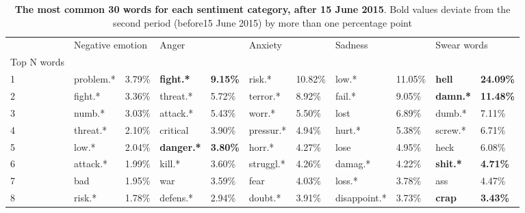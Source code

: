 \begin{table}[h]\centering
\caption{\textbf{The most common 30 words for each sentiment category, after 15 June 2015}. Bold values deviate from the second period (before15 June 2015) by more than one percentage point}
	\label{fig: after_1}
\begin{adjustbox}{width=\linewidth, center}
	\begin{tabular}{lllllllllll}
	\toprule
	{} & \multicolumn{2}{l}{Negative emotion} & \multicolumn{2}{l}{Anger} & \multicolumn{2}{l}{Anxiety} & \multicolumn{2}{l}{Sadness} & \multicolumn{2}{l}{Swear words} \\
	Top N words          &                  &            &                    &                  &              &            &               &            &                  &                   \\
	\midrule
	1                    &        problem.* &     3.79\% &   \textbf{fight.*} &  \textbf{9.15\%} &       risk.* &    10.82\% &         low.* &    11.05\% &    \textbf{hell} &  \textbf{24.09\%} \\
	2                    &          fight.* &     3.36\% &           threat.* &           5.72\% &     terror.* &     8.92\% &        fail.* &     9.05\% &  \textbf{damn.*} &  \textbf{11.48\%} \\
	3                    &           numb.* &     3.03\% &           attack.* &           5.43\% &       worr.* &     5.50\% &          lost &     6.89\% &           dumb.* &            7.11\% \\
	4                    &         threat.* &     2.10\% &           critical &           3.90\% &    pressur.* &     4.94\% &        hurt.* &     5.38\% &          screw.* &            6.71\% \\
	5                    &            low.* &     2.04\% &  \textbf{danger.*} &  \textbf{3.80\%} &       horr.* &     4.27\% &          lose &     4.95\% &             heck &            6.08\% \\
	6                    &         attack.* &     1.99\% &             kill.* &           3.60\% &    struggl.* &     4.26\% &       damag.* &     4.22\% &  \textbf{shit.*} &   \textbf{4.71\%} \\
	7                    &              bad &     1.95\% &                war &           3.59\% &         fear &     4.03\% &        loss.* &     3.78\% &              ass &            4.47\% \\
	8                    &           risk.* &     1.78\% &           defens.* &           2.94\% &      doubt.* &     3.91\% &  disappoint.* &     3.73\% &    \textbf{crap} &   \textbf{3.43\%} \\

\end{tabular}
\end{adjustbox}
\end{table}
